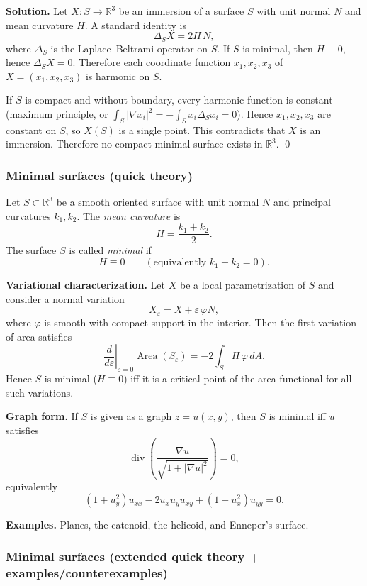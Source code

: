 \documentclass[12pt,a4paper]{article}
\theoremstyle{plain}
\theoremstyle{definition}      %
\begin{document}
	\medskip
	\textbf{Solution.}
	Let $X:S\to\mathbb R^3$ be an immersion of a surface $S$ with unit normal $N$ and mean curvature $H$.
	A standard identity is
	\[
	\Delta_S X = 2H\,N,
	\]
	where $\Delta_S$ is the Laplace--Beltrami operator on $S$.
	If $S$ is minimal, then $H\equiv 0$, hence $\Delta_S X=0$.
	Therefore each coordinate function $x_1,x_2,x_3$ of $X=(x_1,x_2,x_3)$ is harmonic on $S$.
	
	If $S$ is compact and without boundary, every harmonic function is constant (maximum principle, or
	$\int_S |\nabla x_i|^2 = -\int_S x_i\Delta_S x_i = 0$).
	Hence $x_1,x_2,x_3$ are constant on $S$, so $X(S)$ is a single point.
	This contradicts that $X$ is an immersion. Therefore no compact minimal surface exists in $\mathbb R^3$.
	\qed
	
	\subsubsection*{Minimal surfaces (quick theory)}
	
	Let $S\subset\mathbb{R}^3$ be a smooth oriented surface with unit normal $N$ and principal
	curvatures $k_1,k_2$. The \emph{mean curvature} is
	\[
	H=\frac{k_1+k_2}{2}.
	\]
	The surface $S$ is called \emph{minimal} if
	\[
	H\equiv 0 \qquad (\text{equivalently } k_1+k_2=0).
	\]
	
	\medskip
	\textbf{Variational characterization.}
	Let $X$ be a local parametrization of $S$ and consider a normal variation
	\[
	X_\varepsilon = X+\varepsilon\,\varphi N,
	\]
	where $\varphi$ is smooth with compact support in the interior.
	Then the first variation of area satisfies
	\[
	\left.\frac{d}{d\varepsilon}\right|_{\varepsilon=0}\!\operatorname{Area}(S_\varepsilon)
	= -2\int_S H\,\varphi\, dA.
	\]
	Hence $S$ is minimal ($H\equiv 0$) iff it is a critical point of the area functional for all such
	variations.
	
	\medskip
	\textbf{Graph form.}
	If $S$ is given as a graph $z=u(x,y)$, then $S$ is minimal iff $u$ satisfies
	\[
	\operatorname{div}\!\left(\frac{\nabla u}{\sqrt{1+|\nabla u|^2}}\right)=0,
	\]
	equivalently
	\[
	(1+u_y^2)u_{xx}-2u_xu_yu_{xy}+(1+u_x^2)u_{yy}=0.
	\]
	
	\medskip
	\textbf{Examples.} Planes, the catenoid, the helicoid, and Enneper's surface.
	
	
	\subsubsection*{Minimal surfaces (extended quick theory + examples/counterexamples)}
	
\end{document}
